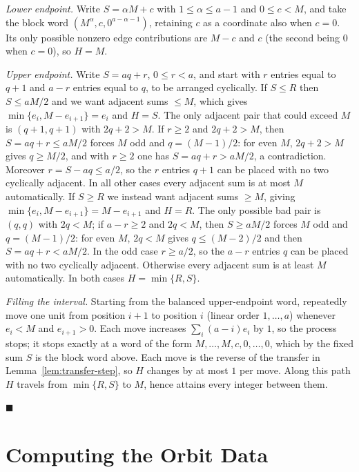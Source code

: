 \documentclass[preprint,12pt,a4paper]{elsarticle}
\theoremstyle{definition}
\theoremstyle{remark}
\begin{document}
\emph{Lower endpoint.}  Write $S=\alpha M+c$ with $1\leq\alpha\leq a-1$ and
$0\leq c<M$, and take the block word
$(M^\alpha,c,0^{a-\alpha-1})$, retaining $c$ as a coordinate also when
$c=0$.  Its only possible nonzero edge contributions are $M-c$ and $c$ (the
second being $0$ when $c=0$), so $H=M$.

\emph{Upper endpoint.}  Write $S=aq+r$, $0\leq r<a$, and start with $r$ entries
equal to $q+1$ and $a-r$ entries equal to $q$, to be arranged cyclically.  If
$S\leq R$ then $S\leq aM/2$ and we want adjacent sums $\leq M$, which gives
$\min\{e_i,M-e_{i+1}\}=e_i$ and $H=S$.  The only adjacent pair that could exceed
$M$ is $(q+1,q+1)$ with $2q+2>M$.  If $r\geq2$ and $2q+2>M$, then
$S=aq+r\leq aM/2$ forces $M$ odd and $q=(M-1)/2$: for even $M$,
$2q+2>M$ gives $q\geq M/2$, and with $r\geq2$ one has $S=aq+r>aM/2$, a
contradiction.  Moreover $r=S-aq\leq a/2$, so the $r$ entries $q+1$ can be
placed with no two cyclically adjacent.  In all other cases every adjacent sum
is at most $M$ automatically.  If $S\geq R$ we instead want adjacent sums
$\geq M$, giving $\min\{e_i,M-e_{i+1}\}=M-e_{i+1}$ and $H=R$.  The only
possible bad pair is $(q,q)$ with $2q<M$; if $a-r\geq2$ and $2q<M$, then
$S\geq aM/2$ forces $M$ odd and $q=(M-1)/2$: for even $M$, $2q<M$ gives
$q\leq(M-2)/2$ and then $S=aq+r<aM/2$.  In the odd case $r\geq a/2$, so the
$a-r$ entries $q$ can be placed with no two cyclically adjacent.  Otherwise
every adjacent sum is at least $M$ automatically.  In both
cases $H=\min\{R,S\}$.

\emph{Filling the interval.}  Starting from the balanced upper-endpoint word,
repeatedly move one unit from position $i+1$ to position $i$ (linear order
$1,\ldots,a$) whenever $e_i<M$ and $e_{i+1}>0$.  Each move increases
$\sum_i(a-i)e_i$ by $1$, so the process stops; it stops exactly at a word of
the form $M,\ldots,M,c,0,\ldots,0$, which by the fixed sum $S$ is the block
word above.  Each move is the reverse of the transfer in
Lemma~\ref{lem:transfer-step}, so $H$ changes by at most $1$ per move.  Along
this path $H$ travels from $\min\{R,S\}$ to $M$, hence attains every integer
between them.

\hfill$\blacksquare$

\section{Computing the Orbit Data}\label{sec:orbit-data}
\end{document}
